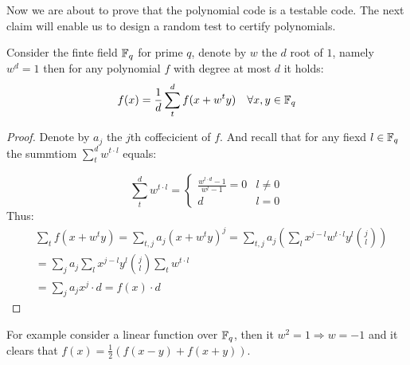 
%
%
%


Now we are about to prove that the polynomial code is a testable code. The next claim will enable us to design a random test to certify polynomials.

\begin{claim}
  Consider the finte field $\mathbb{F}_{q}$ for prime $q$, denote by $w$ the $d$ root of $1$, namely $w^{d}  = 1$ then for any polynomial $f$ with degree at most $d$ it holds:   
  \begin{equation}
    \label{eq:poly}
    f(x) = \frac{1}{d} \sum_{t}^{d}{f( x + w^{t}y)}  \ \ \ \forall x,y \in \mathbb{F}_{q}
  \end{equation} 
\end{claim}
\begin{proof}
  Denote by $a_{j}$ the $j$th coffecicient of $f$. And recall that for any fiexd $l \in \mathbb{F}_{q}$ the summtiom $ \sum_{t}^{d}w^{t\cdot l}$ equals: 

  \begin{equation*}
    \sum_{t}^{d}w^{t\cdot l} = \begin{cases}
      \frac{w^{l \cdot d} - 1}{ w^{l} - 1 } = 0  & l \neq 0 \\
      d   & l = 0
    \end{cases}
  \end{equation*}
Thus:  
  \begin{equation*}
    \begin{split}
  &  \sum_{t}{ f\left( x + w^{t}y \right)  } = \sum_{t,j}{a_{j}\left( x + w^{t}y \right)^{j}}  =  \sum_{t,j}{ a_{j} \left( \sum_{l} x^{j-l} w^{t\cdot l}y^{l} { j \choose l} \right)} \\
  & =  \sum_{j}{ a_{j} \sum_{l} x^{j-l} y^{l} { j \choose l} \sum_{t} w^{t\cdot l} } \\
  & = \sum_{j}{ a_{j}  x^{j} \cdot d } = f(x) \cdot d  
    \end{split}
  \end{equation*}
\end{proof}
\begin{example}
For example consider a linear function over $\mathbb{F}_{q}$, then it $w^2 = 1 \Rightarrow w = -1 $ and it clears that $f(x) = \frac{1}{2} \left( f(x - y) + f(x + y) \right)$.
\end{example}

